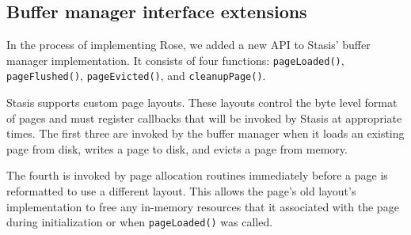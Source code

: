 \documentclass{vldb}
\newcommand{\rows}{Rose\xspace}
\newcommand{\rowss}{Rose's\xspace}
\begin{document}



\subsection{Buffer manager interface extensions}

In the process of implementing \rows, we added a new API to
Stasis' buffer manager implementation.  It consists of four
functions: {\tt pageLoaded()}, {\tt pageFlushed()}, {\tt pageEvicted()},
and {\tt cleanupPage()}.

Stasis supports custom page layouts.  These %
layouts control the byte level format of pages and must register
callbacks that will be invoked by Stasis at appropriate times.  The
first three are invoked by the buffer manager when it loads an
existing page from disk, writes a page to disk, and evicts a page
from memory.

The fourth is invoked by page allocation
routines immediately before a page is reformatted to use a different
layout.  This allows the page's old layout's implementation to
free any in-memory resources that it associated with the page during
initialization or when {\tt pageLoaded()} was called.

\end{document}
